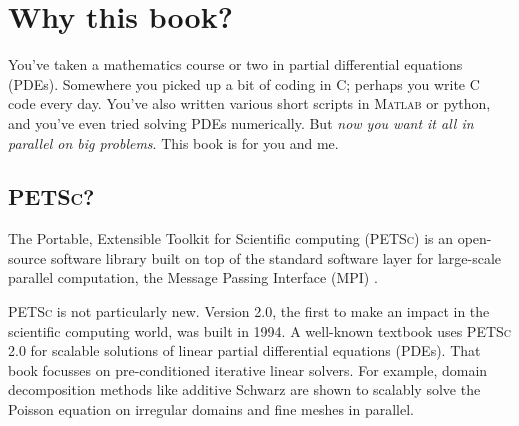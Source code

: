 \documentclass{tufte-book}
\theoremstyle{definition}
\newcommand{\Matlab}{\textsc{Matlab}\xspace}
\newcommand{\PETSc}{\textsc{PETSc}\xspace}
\begin{document}
\tableofcontents

\begin{comment}
\cleardoublepage
~\vfill
\begin{doublespace}
\noindent\fontsize{18}{22}\selectfont\itshape
\nohyphenation
Thanks to \mbox{Jed Brown} and \mbox{Constantine Khroulev}, fellow students, and gurus.
\end{doublespace}
\vfill
\end{comment}


\chapter{Why this book?}


You've taken a mathematics course or two in partial differential equations (PDEs).  Somewhere you picked up a bit of coding in C; perhaps you write C code every day.  You've also written various short scripts in \Matlab or python, and you've even tried solving PDEs numerically.  But \emph{now you want it all in parallel on big problems}.  This book is for you and me.

\section{\PETSc?}

The Portable, Extensible Toolkit for Scientific computing (\PETSc{}) \citep{petsc-user-ref} is an open-source software library built on top of the standard software layer for large-scale parallel computation, the Message Passing Interface (MPI) \citep{Groppetal1999}.

\PETSc is not particularly new.  Version 2.0, the first to make an impact in the scientific computing world, was built in 1994.  A well-known textbook \citet{Smithetal1996} uses \PETSc 2.0 for scalable solutions of linear partial differential equations (PDEs).  That book focusses on pre-conditioned iterative linear solvers.  For example, domain decomposition methods like additive Schwarz are shown to scalably solve the Poisson equation on irregular domains and fine meshes in parallel.
\end{document}
